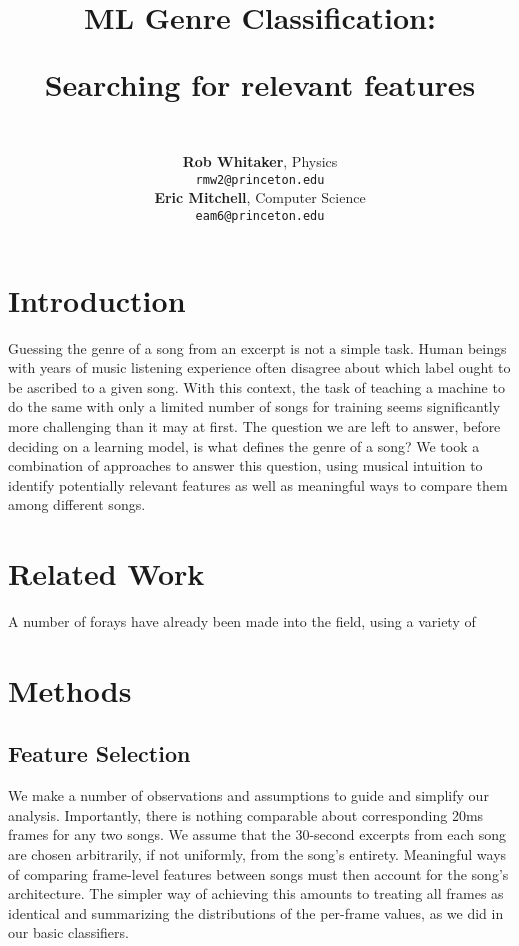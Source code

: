 \documentclass{article} %
\title{ML Genre Classification: \\
\begin{large} Searching for relevant features \end{large} }
\author{\\
\textbf{Rob Whitaker}, 
Physics \\
\texttt{rmw2@princeton.edu} \\
\textbf{Eric Mitchell}, 
Computer Science \\
\texttt{eam6@princeton.edu} \\
}
\begin{document}
\maketitle

\begin{abstract}

\end{abstract}

\section{Introduction}
Guessing the genre of a song from an excerpt is not a simple task.  Human beings with years of music listening experience often disagree about which label ought to be ascribed to a given song.  With this context, the task of teaching a machine to do the same with only a limited number of songs for training seems significantly more challenging than it may at first.  The question we are left to answer, before deciding on a learning model, is what defines the genre of a song?  We took a combination of approaches to answer this question, using musical intuition to identify potentially relevant features as well as meaningful ways to compare them among different songs.  

\section{Related Work}
A number of forays have already been made into the field, using a variety of 

\section{Methods}
\subsection{Feature Selection}

We make a number of observations and assumptions to guide and simplify our analysis.  Importantly, there is nothing comparable about corresponding 20ms frames for any two songs.  We assume that the 30-second excerpts from each song are chosen arbitrarily, if not uniformly, from the song's entirety.  Meaningful ways of comparing frame-level features between songs must then account for the song's architecture.  The simpler way of achieving this amounts to treating all frames as identical and summarizing the distributions of the per-frame values, as we did in our basic classifiers.
\end{document}
